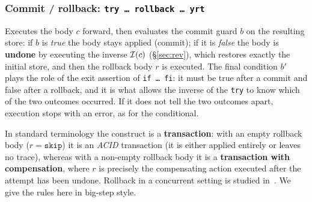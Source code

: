 \subsubsection{Commit / rollback: \texttt{try\,\dots\,rollback\,\dots\,yrt}}
\label{sec:try}
Executes the body $c$ forward, then evaluates the commit guard $b$ on the
resulting store: if $b$ is \emph{true} the body stays applied (commit); if it is
\emph{false} the body is \textbf{undone} by executing the inverse $\mathcal{I}(c)$
(\S\ref{sec:rev}), which restores exactly the initial store, and then the
rollback body $r$ is executed. The final condition $b'$ plays the role of the
exit assertion of \texttt{if\,\dots\,fi}: it must be true after a
commit and false after a rollback, and it is what allows the inverse of the
\texttt{try} to know which of the two outcomes occurred. If it does not tell
the two outcomes apart, execution stops with an error, as for the conditional.

\medskip
\noindent
In standard terminology the construct is a \textbf{transaction}: with an empty
rollback body ($r = \mathtt{skip}$) it is an \emph{ACID} transaction (it is
either applied entirely or leaves no trace), whereas with a non-empty rollback
body it is a \textbf{transaction with compensation}, where $r$ is precisely
the compensating action executed after the attempt has been undone. Rollback in
a concurrent setting is studied in~\cite{LaneseMezzinaSchmittStefani2011,
LaneseLienhardtMezzinaSchmittStefani2013}. We give the rules here in
big-step style.

